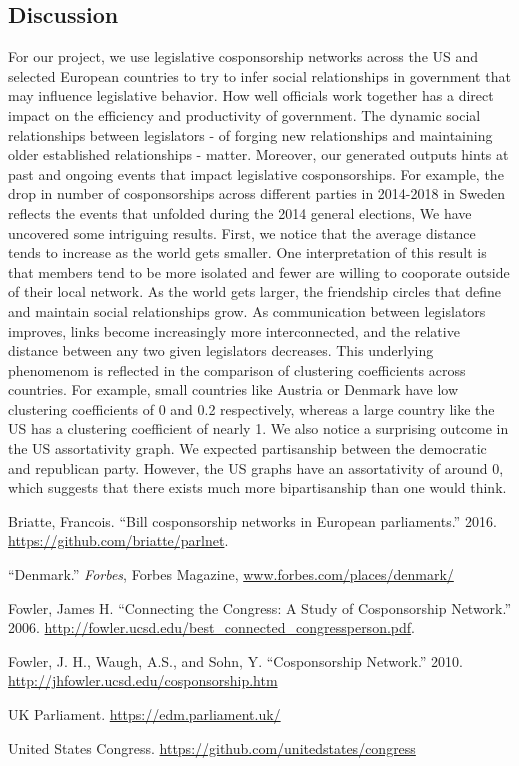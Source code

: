 \documentclass[12pt]{article}
\begin{document}
\begin{multicols*}{2}
\section{Discussion}
For our project, we use legislative cosponsorship networks across the US and selected European countries to try to infer social relationships in government that may influence legislative behavior. How well officials work together has a direct impact on the efficiency and productivity of government. The dynamic social relationships between legislators - of forging new relationships and maintaining older established relationships - matter. Moreover, our generated outputs hints at past and ongoing events that impact legislative cosponsorships. For example, the drop in number of cosponsorships across different parties in 2014-2018 in Sweden reflects the events that unfolded during the 2014 general elections, 
We have uncovered some intriguing results. First, we notice that the average distance tends to increase as the world gets smaller. One interpretation of this result is that members tend to be more isolated and fewer are willing to cooporate outside of their local network. As the world gets larger, the friendship circles that define and maintain social relationships grow. As communication between legislators improves, links become increasingly more interconnected, and the relative distance between any two given legislators decreases. This underlying phenomenom is reflected in the comparison of clustering coefficients across countries. For example, small countries like Austria or Denmark have low clustering coefficients of 0 and 0.2 respectively, whereas a large country like the US has a clustering coefficient of nearly 1. 
We also notice a surprising outcome in the US assortativity graph. We expected partisanship between the democratic and republican party. However, the US graphs have an assortativity of around 0, which suggests that there exists much more bipartisanship than one would think.  


\newpage
\begin{thebibliography}{9}

 Briatte, Francois. ``Bill cosponsorship networks in European parliaments.'' 2016. \url{https://github.com/briatte/parlnet}.

 ``Denmark.'' \emph{Forbes}, Forbes Magazine, \url{www.forbes.com/places/denmark/}

 Fowler, James H. ``Connecting the Congress: A Study of Cosponsorship Network.'' 2006. \url{http://fowler.ucsd.edu/best_connected_congressperson.pdf}.

 Fowler, J. H., Waugh, A.S., and Sohn, Y. ``Cosponsorship Network.'' 2010. \url {http://jhfowler.ucsd.edu/cosponsorship.htm}

 UK Parliament. \url{https://edm.parliament.uk/}

 United States Congress. \url{https://github.com/unitedstates/congress}
\end{thebibliography}


\end{multicols*}
\end{document}
